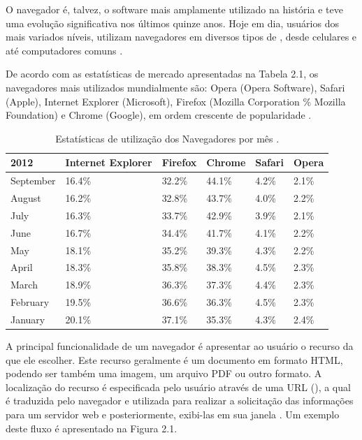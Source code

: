 \documentclass[espaco=simples,appendix=Name]{abnt}
\begin{document}
O navegador é, talvez, o software mais amplamente utilizado na história e teve uma evolução significativa nos últimos quinze anos. Hoje em dia, usuários dos mais variados níveis, utilizam navegadores em diversos tipos de , desde celulares e  até computadores comuns \cite{ArchitectureWebBrowsers}.

De acordo com as estatísticas de mercado apresentadas na Tabela 2.1, os navegadores mais utilizados mundialmente são: Opera (Opera Software), Safari (Apple), Internet Explorer (Microsoft), Firefox (Mozilla Corporation \% Mozilla Foundation) e Chrome (Google), em ordem crescente de popularidade \cite{W3schools}.

\begin{table}[ht]
	\centering
	\caption{Estatísticas de utilização dos Navegadores por mês \cite{W3schools}.
	\label{tbl:padc}}{
		\vspace{0.3cm}
		\begin{tabular}{|l|l|l|l|l|l|}
	    	\hline
			\textbf{2012} & \textbf{Internet Explorer} & \textbf{Firefox} &\textbf{Chrome} & \textbf{Safari} & \textbf{Opera} \\
			\hline
			September	& 16.4\% & 32.2\% & 44.1\% & 4.2\% & 2.1\% \\
			\hline
			August		& 16.2\% & 32.8\% & 43.7\% & 4.0\% & 2.2\% \\
			\hline
			July		& 16.3\% & 33.7\% & 42.9\% & 3.9\% & 2.1\% \\
			\hline
			June		& 16.7\% & 34.4\% & 41.7\% & 4.1\% & 2.2\% \\
			\hline
			May			& 18.1\% & 35.2\% & 39.3\% & 4.3\% & 2.2\% \\
			\hline
			April		& 18.3\% & 35.8\% &	38.3\% & 4.5\% & 2.3\% \\
			\hline
			March		& 18.9\% & 36.3\% &	37.3\% & 4.4\% & 2.3\% \\
			\hline
			February	& 19.5\% & 36.6\% &	36.3\% & 4.5\% & 2.3\% \\
			\hline
			January		& 20.1\% & 37.1\% &	35.3\% & 4.3\% & 2.4\% \\
			\hline
		\end{tabular}
		}
\end{table}

A principal funcionalidade de um navegador é apresentar ao usuário o recurso da  que ele escolher. Este  recurso geralmente é um documento em formato HTML, podendo ser também uma imagem, um arquivo PDF ou outro formato. A localização do recurso é especificada pelo usuário através de uma URL (), a qual é traduzida pelo navegador e utilizada para realizar a solicitação das informações para um servidor web e posteriormente, exibi-las em sua janela \cite{ArchitectureWebBrowsers}. Um exemplo deste fluxo é apresentado na Figura 2.1.
\end{document}
